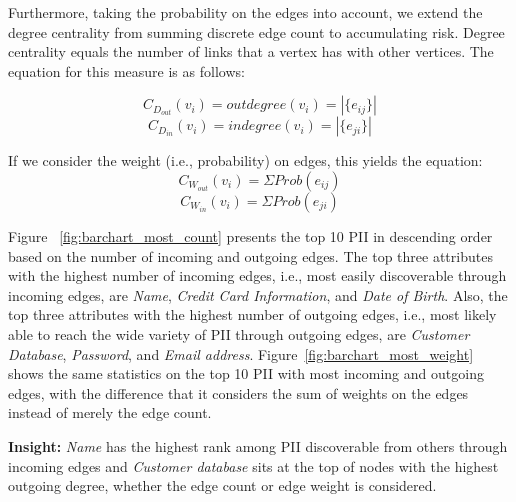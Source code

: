 \documentclass[conference]{IEEEtran}
\begin{document}

 Furthermore, taking the probability on the edges into account, we extend the degree centrality from summing discrete edge count to accumulating risk.
Degree centrality equals the number of links that a vertex has with other vertices. The equation for this measure is as follows: 

\begin{equation}
C_{D_{out}}(v_i) = outdegree(v_{i}) = |\{e_{ij}\}|
\end{equation}
\begin{equation}
C_{D_{in}}(v_i) = indegree(v_{i}) = |\{e_{ji}\}|
\end{equation}

If we consider the weight (i.e., probability) on edges, this yields the equation:
\begin{equation}
C_{W_{out}}(v_i) = \Sigma Prob(e_{ij})
\end{equation}
\begin{equation}
C_{W_{in}}(v_i) = \Sigma Prob(e_{ji})
\end{equation}

Figure ~\ref{fig:barchart_most_count} presents the top 10 PII in descending order based on the number of incoming and outgoing edges. The top three attributes with the highest number of incoming edges, i.e., most easily discoverable through incoming edges, are \textit{Name}, \textit{Credit Card Information}, and \textit{Date of Birth}. Also, the top three attributes with the highest number of outgoing edges, i.e., most likely able to reach the wide variety of PII through outgoing edges, are \textit{Customer Database}, \textit{Password}, and \textit{Email address}. Figure~\ref{fig:barchart_most_weight} shows the same statistics on the top 10 PII with most incoming and outgoing edges, with the difference that it considers the sum of weights on the edges instead of merely the edge count.

{\bf Insight:} \textit{Name} has the highest rank among PII discoverable from others through incoming edges and \textit{Customer database} sits at the top of nodes with the highest outgoing degree, whether the edge count or edge weight is considered.
\end{document}

